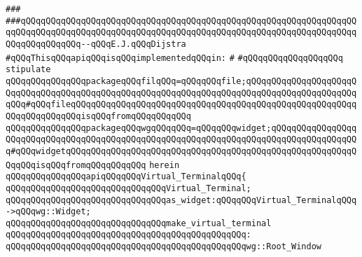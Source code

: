 \verb|###|\newline
\verb|###qQQqqQQqqQQqqQQqqQQqqQQqqQQqqQQqqQQqqQQqqQQqqQQqqQQqqQQqqQQqqQQqqQQqqQQqqQQqqQQqqQQqqQQqqQQqqQQqqQQqqQQqqQQqqQQqqQQqqQQqqQQqqQQqqQQqqQQqqQQqqQQqqQQqqQQq--qQQqE.J.qQQqDijstra|\newline
\newline
\newline
\verb|#qQQqThisqQQqapiqQQqisqQQqimplementedqQQqin:|\newline
\verb|#|\newline
\verb|#qQQqqQQqqQQqqQQqqQQq|\newline
\newline
\verb|stipulate|\newline
\verb|qQQqqQQqqQQqqQQqpackageqQQqfilqQQq=qQQqqQQqfile;qQQqqQQqqQQqqQQqqQQqqQQqqQQqqQQqqQQqqQQqqQQqqQQqqQQqqQQqqQQqqQQqqQQqqQQqqQQqqQQqqQQqqQQqqQQqqQQq#qQQqfileqQQqqQQqqQQqqQQqqQQqqQQqqQQqqQQqqQQqqQQqqQQqqQQqqQQqqQQqqQQqqQQqqQQqqQQqisqQQqfromqQQqqQQqqQQq|\newline
\verb|qQQqqQQqqQQqqQQqpackageqQQqwgqQQqqQQq=qQQqqQQqwidget;qQQqqQQqqQQqqQQqqQQqqQQqqQQqqQQqqQQqqQQqqQQqqQQqqQQqqQQqqQQqqQQqqQQqqQQqqQQqqQQqqQQqqQQq#qQQqwidgetqQQqqQQqqQQqqQQqqQQqqQQqqQQqqQQqqQQqqQQqqQQqqQQqqQQqqQQqqQQqqQQqisqQQqfromqQQqqQQqqQQq|\newline
\verb|herein|\newline
\newline
\verb|qQQqqQQqqQQqqQQqapiqQQqqQQqVirtual_TerminalqQQq{|\newline
\newline
\verb|qQQqqQQqqQQqqQQqqQQqqQQqqQQqqQQqVirtual_Terminal;|\newline
\newline
\verb|qQQqqQQqqQQqqQQqqQQqqQQqqQQqqQQqas_widget:qQQqqQQqVirtual_TerminalqQQq->qQQqwg::Widget;|\newline
\newline
\newline
\verb|qQQqqQQqqQQqqQQqqQQqqQQqqQQqqQQqmake_virtual_terminal|\newline
\verb|qQQqqQQqqQQqqQQqqQQqqQQqqQQqqQQqqQQqqQQqqQQqqQQq:|\newline
\verb|qQQqqQQqqQQqqQQqqQQqqQQqqQQqqQQqqQQqqQQqqQQqqQQqwg::Root_Window|\newline
